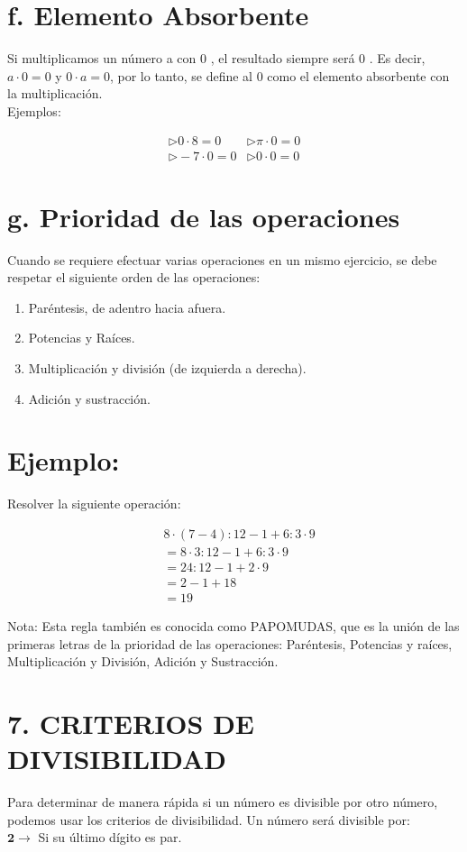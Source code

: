 \documentclass[10pt]{article}
\begin{document}
\section*{f. Elemento Absorbente}
Si multiplicamos un número a con 0 , el resultado siempre será 0 . Es decir, $a \cdot 0=0$ y $0 \cdot a=0$, por lo tanto, se define al 0 como el elemento absorbente con la multiplicación.\\
Ejemplos:

$$
\begin{array}{ll}
\triangleright 0 \cdot 8=0 & \triangleright \pi \cdot 0=0 \\
\triangleright-7 \cdot 0=0 & \triangleright 0 \cdot 0=0
\end{array}
$$

\section*{g. Prioridad de las operaciones}
Cuando se requiere efectuar varias operaciones en un mismo ejercicio, se debe respetar el siguiente orden de las operaciones:

\begin{enumerate}
  \item Paréntesis, de adentro hacia afuera.
  \item Potencias y Raíces.
  \item Multiplicación y división (de izquierda a derecha).
  \item Adición y sustracción.
\end{enumerate}

\section*{Ejemplo:}
Resolver la siguiente operación:

$$
\begin{aligned}
& 8 \cdot(7-4): 12-1+6: 3 \cdot 9 \\
& =8 \cdot 3: 12-1+6: 3 \cdot 9 \\
& =24: 12-1+2 \cdot 9 \\
& =2-1+18 \\
& =19
\end{aligned}
$$

Nota: Esta regla también es conocida como PAPOMUDAS, que es la unión de las primeras letras de la prioridad de las operaciones: Paréntesis, Potencias y raíces, Multiplicación y División, Adición y Sustracción.

\section*{7. CRITERIOS DE DIVISIBILIDAD}
Para determinar de manera rápida si un número es divisible por otro número, podemos usar los criterios de divisibilidad. Un número será divisible por:\\
$\mathbf{2} \rightarrow$ Si su último dígito es par.
\end{document}
